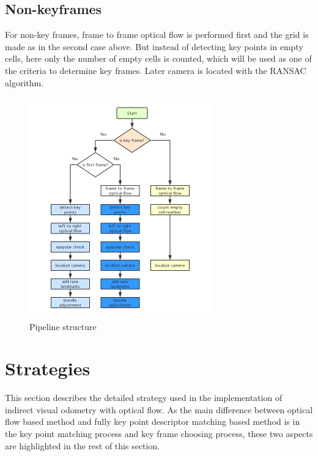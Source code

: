 \documentclass{easychair}
\begin{document}
\subsection{Non-keyframes}
For non-key frames, frame to frame optical flow is performed first and the grid is made as in the second case above. But instead of detecting key points in empty cells, here only the number of empty cells is counted, which will be used as one of the criteria to determine key frames. Later camera is located with the RANSAC algorithm.\\

\begin{figure}[h!]
	\centering
	\includegraphics[width=0.7\textwidth]{img/flowchart.png}
	\caption{Pipeline structure}
	\label{fig:pipeline structure}
\end{figure}



\section{Strategies}
This section describes the detailed strategy used in the implementation of indirect visual odometry with optical flow. As the main difference between optical flow based method and fully key point descriptor matching based method is in the key point matching process and key frame choosing process, these two aspects are highlighted in the rest of this section.

\end{document}
